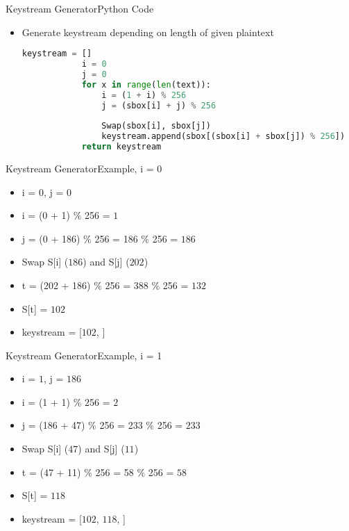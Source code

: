 \documentclass[
	aspectratio=169,	%
	onlytextwidth,		%
	t,					%
	]{beamer}
\begin{document}
\begin{frame}[fragile]{Keystream Generator}{Python Code}
	\begin{itemize}
		\item Generate keystream depending on length of given plaintext
		\begin{lstlisting}[language=Python]
			keystream = []
			i = 0
			j = 0
			for x in range(len(text)):
				i = (1 + i) % 256
				j = (sbox[i] + j) % 256
				
				Swap(sbox[i], sbox[j])
				keystream.append(sbox[(sbox[i] + sbox[j]) % 256])    
			return keystream   
		\end{lstlisting}
	\end{itemize}
\end{frame}

\begin{frame}[fragile]{Keystream Generator}{Example, i = 0}
	\begin{itemize}
		\item i = $0$, j = $0$
		\item i = (0 + 1) $\%$ 256 = $1$
		\item j = (0 + 186) $\%$ 256 = 186 $\%$ 256 = $186$
		\item Swap S[i] ($186$) and S[j] ($202$)
		\item t = (202 + 186) $\%$ 256 = 388 $\%$ 256 = $132$
		\item S[t] = $102$
		\item keystream = [$102$, ]
	\end{itemize}
\end{frame}

\begin{frame}[fragile]{Keystream Generator}{Example, i = 1}
	\begin{itemize}
		\item i = $1$, j = $186$
		\item i = (1 + 1) $\%$ 256 = $2$
		\item j = (186 + 47) $\%$ 256 = 233 $\%$ 256 = $233$
		\item Swap S[i] ($47$) and S[j] ($11$)
		\item t = (47 + 11) $\%$ 256 = 58 $\%$ 256 = $58$
		\item S[t] = $118$
		\item keystream = [$102$, $118$, ]
	\end{itemize}
\end{frame}
\end{document}
